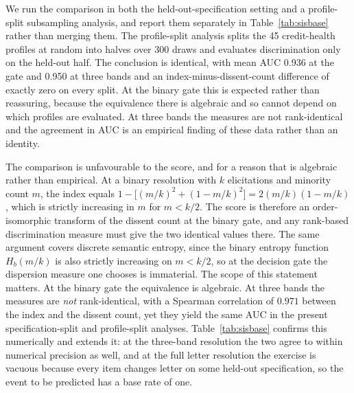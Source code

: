\documentclass[a4paper,fleqn]{cas-sc}
\begin{document}
We run the comparison in both the held-out-specification setting and a profile-split subsampling analysis, and report them separately in Table~\ref{tab:sisbase} rather than merging
them. The profile-split analysis splits the 45 credit-health profiles at random into
halves over 300 draws and evaluates discrimination only on the held-out half. The conclusion is identical, with mean AUC
0.936 at the gate and 0.950 at three bands and an index-minus-dissent-count difference of exactly
zero on every split. At the binary gate this is expected rather than reassuring, because the equivalence there is
algebraic and so cannot depend on which profiles are evaluated. At three bands the measures are not
rank-identical and the agreement in AUC is an empirical finding of these data rather than an
identity.

The comparison is unfavourable to the score, and for a reason that is algebraic rather than
empirical. At a binary resolution with $k$ elicitations and minority count $m$, the index equals
$1-\big[(m/k)^2+(1-m/k)^2\big]=2(m/k)(1-m/k)$, which is strictly increasing in $m$ for $m<k/2$. The
score is therefore an order-isomorphic transform of the dissent count at the binary gate, and any
rank-based discrimination measure must give the two identical values there. The same argument covers
discrete semantic entropy, since the binary entropy function $H_b(m/k)$ is also strictly increasing
on $m<k/2$, so at the decision gate the dispersion measure one chooses is immaterial. The scope of
this statement matters. At the binary gate the equivalence is algebraic. At three bands the measures
are \emph{not} rank-identical, with a Spearman correlation of $0.971$ between the index and the
dissent count, yet they yield the same AUC in the present specification-split and profile-split
analyses. Table~\ref{tab:sisbase} confirms this
numerically and extends it: at the three-band resolution the two agree to within numerical
precision as well, and at the full letter resolution the exercise is vacuous because every item
changes letter on some held-out specification, so the event to be predicted has a base rate of one.
\end{document}
